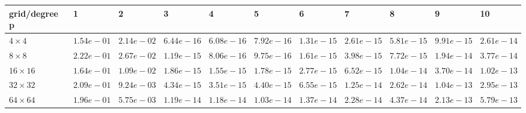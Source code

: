 \begin{tabular}{lllllllllll}
\hline
 grid/degree p   & 1          & 2          & 3          & 4          & 5          & 6          & 7          & 8          & 9          & 10         \\
\hline
 $4 \times 4$    & $1.54e-01$ & $2.14e-02$ & $6.44e-16$ & $6.08e-16$ & $7.92e-16$ & $1.31e-15$ & $2.61e-15$ & $5.81e-15$ & $9.91e-15$ & $2.61e-14$ \\
 $8 \times 8$    & $2.22e-01$ & $2.67e-02$ & $1.19e-15$ & $8.06e-16$ & $9.75e-16$ & $1.61e-15$ & $3.98e-15$ & $7.72e-15$ & $1.94e-14$ & $3.77e-14$ \\
 $16 \times 16$  & $1.64e-01$ & $1.09e-02$ & $1.86e-15$ & $1.55e-15$ & $1.78e-15$ & $2.77e-15$ & $6.52e-15$ & $1.04e-14$ & $3.70e-14$ & $1.02e-13$ \\
 $32 \times 32$  & $2.09e-01$ & $9.24e-03$ & $4.34e-15$ & $3.51e-15$ & $4.40e-15$ & $6.55e-15$ & $1.25e-14$ & $2.62e-14$ & $1.04e-13$ & $2.95e-13$ \\
 $64 \times 64$  & $1.96e-01$ & $5.75e-03$ & $1.19e-14$ & $1.18e-14$ & $1.03e-14$ & $1.37e-14$ & $2.28e-14$ & $4.37e-14$ & $2.13e-13$ & $5.79e-13$ \\
\hline
\end{tabular}